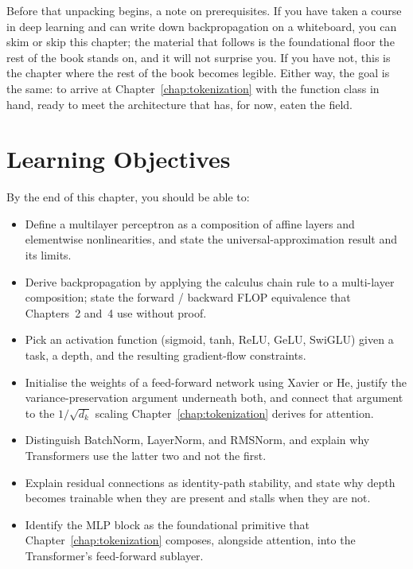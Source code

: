 Before that unpacking begins, a note on prerequisites. If you
have taken a course in deep learning and can write down
backpropagation on a whiteboard, you can skim or skip this
chapter; the material that follows is the foundational floor the
rest of the book stands on, and it will not surprise you. If you
have not, this is the chapter where the rest of the book becomes
legible. Either way, the goal is the same: to arrive at Chapter~\ref{chap:tokenization}
with the function class in hand, ready to meet the architecture
that has, for now, eaten the field.


\section{Learning Objectives}

By the end of this chapter, you should be able to:
\begin{itemize}
  \item Define a multilayer perceptron as a composition of affine
        layers and elementwise nonlinearities, and state the
        universal-approximation result and its limits.
  \item Derive backpropagation by applying the calculus chain rule
        to a multi-layer composition; state the forward / backward
        FLOP equivalence that Chapters~2 and~4 use without proof.
  \item Pick an activation function (sigmoid, tanh, ReLU, GeLU,
        SwiGLU) given a task, a depth, and the resulting
        gradient-flow constraints.
  \item Initialise the weights of a feed-forward network using
        Xavier or He, justify the variance-preservation argument
        underneath both, and connect that argument to the
        $1/\sqrt{d_k}$ scaling Chapter~\ref{chap:tokenization} derives for attention.
  \item Distinguish BatchNorm, LayerNorm, and RMSNorm, and explain
        why Transformers use the latter two and not the first.
  \item Explain residual connections as identity-path stability,
        and state why depth becomes trainable when they are
        present and stalls when they are not.
  \item Identify the MLP block as the foundational primitive that
        Chapter~\ref{chap:tokenization} composes, alongside attention, into the
        Transformer's feed-forward sublayer.
\end{itemize}

